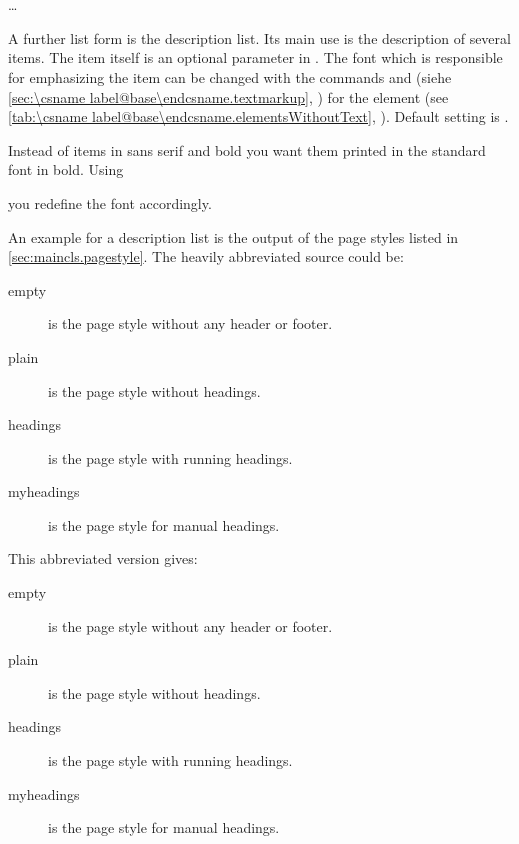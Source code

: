 \begin{Declaration}
  \\
  \quad{}\\
  \quad\dots\\
\end{Declaration}%
%
%
A further list form is the description list. Its main use is the description
of several items. The item itself is an optional parameter in
. The font%
which is responsible for emphasizing the item can be changed with the commands
 and  (siehe \autoref{sec:\csname
  label@base\endcsname.textmarkup}, ) for the element
 (see
\autoref{tab:\csname label@base\endcsname.elementsWithoutText},
). Default
setting is \linebreak[2].%
\ifCommonmaincls
\begin{Example}
  \label{desc:maincls.env.description.example}%
  Instead of items in sans serif and bold you want them printed in the
  standard font in bold. Using
\begin{lstcode}
\end{lstcode}
  you redefine the font accordingly.

  An example for a description list is the output of the page styles
  listed in \autoref{sec:maincls.pagestyle}. The heavily
  abbreviated source could be:
\begin{lstcode}
  \begin{description}
  \item[empty] is the page style without any header or footer.
    \item[plain] is the page style without headings.
    \item[headings] is the page style with running headings.
    \item[myheadings] is the page style for manual headings.
  \end{description}
\end{lstcode}
  This abbreviated version gives:
  \begin{ShowOutput}
    \begin{description}
    \item[empty] is the page style without any header or footer.
    \item[plain] is the page style without headings.
    \item[headings] is the page style with running headings.
    \item[myheadings] is the page style for manual headings.
    \end{description}
  \end{ShowOutput}
\end{Example}
